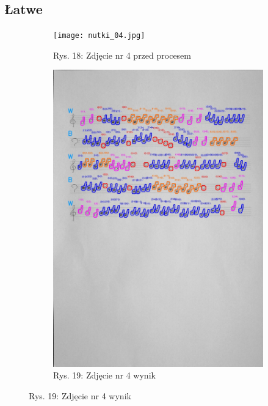 \documentclass[11pt]{article}
\begin{document}
\subsection{Łatwe}

\begin{figure}[H]
    \centering
    \captionsetup[subfigure]{labelformat=empty}
    \begin{subfigure}[b]{0.475\textwidth}
        \centering
        \graphicspath{ {Resources/} }
        \texttt{[image: nutki\_04.jpg]}
        \caption[]%
        {{\small Rys. 18: Zdjęcie nr 4 przed procesem}}
        \label{fig:sub1}
    \end{subfigure}
    \hfill
    \begin{subfigure}[b]{0.475\textwidth}
        \centering
        \graphicspath{ {blobs/} }
        \includegraphics[width=\textwidth]{4_cnts.jpg}
        \caption[]%
        {{\small Rys. 19: Zdjęcie nr 4 wynik}}
        \label{fig:sub2}
    \end{subfigure}
\end{figure}
\end{document}
